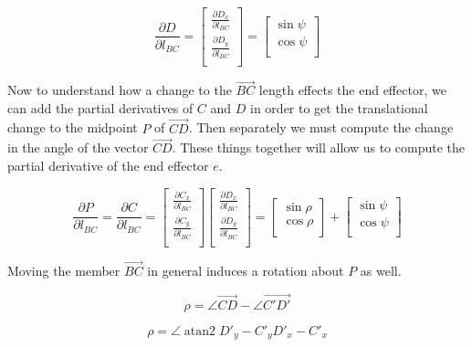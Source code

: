 \documentclass[11pt]{article}
\DeclareMathOperator{\atantwo}{atan2}
\begin{document}
\[
\frac{\partial D}{\partial  l_{BC}} = \begin{bmatrix}
           \frac{\partial D_x}{\partial l_{BC}} \\
           \frac{\partial D_y}{\partial l_{BC}} \\
         \end{bmatrix} = \begin{bmatrix}
           \sin{\psi}  \\
           \cos{\psi} \\
\end{bmatrix}
\]



Now to understand how a change to the $\vec{BC}$ length effects the end effector, we can
add the partial derivatives of $C$ and $D$ in order to get the translational change
to the midpoint $P$ of $\vec{CD}$. Then separately we must compute the change in the angle
of the vector $\vec{CD}$. These things together will allow us to compute the
partial derivative of the end effector $e$.

\[
\frac{\partial P}{\partial  l_{BC}} =
\frac{\partial C}{\partial  l_{BC}} = \begin{bmatrix}
           \frac{\partial C_x}{\partial l_{BC}} \\
           \frac{\partial C_y}{\partial l_{BC}} \\
         \end{bmatrix} \begin{bmatrix}
           \frac{\partial D_x}{\partial l_{BC}} \\
           \frac{\partial D_y}{\partial l_{BC}} \\
\end{bmatrix}
= \begin{bmatrix}
           \sin{\rho}  \\
           \cos{\rho} \\
         \end{bmatrix}
 +
 \begin{bmatrix}
           \sin{\psi}  \\
           \cos{\psi} \\
\end{bmatrix}
 \]

 Moving the member $\vec{BC}$ in general induces a rotation about $P$ as well.

 \[
 \rho = \angle{\vec{CD}} - \angle{\vec{C'D'}}
 \]

 \[
 \rho = \angle{\atantwo{D'_y - C'_y}{D'_x - C'_x}}
 \]
\end{document}
